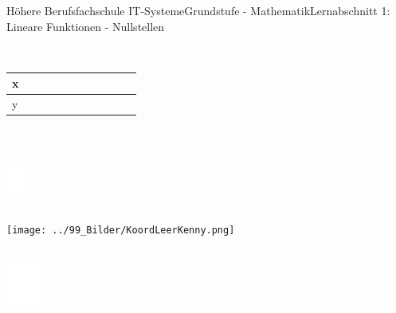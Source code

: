\documentclass[oneside,openany,headings=optiontotoc,11pt,numbers=noenddot]{scrreprt}
\begin{document}
\begin{worksheet}{Höhere Berufsfachschule IT-Systeme}{Grundstufe - Mathematik}{Lernabschnitt 1: Lineare Funktionen - Nullstellen}
\begin{framed}
		\end{framed}
		\begin{framed}
			\noindent
			\small{\color{codegray}{Wertetabelle}}\\
			\par\noindent
			\normalsize
			\begin{tabularx}{\textwidth}{M|M|M|M|M|M|M|M|M|M|M}
				x & & & & & & & & & &\\
				\hline
				y & & & & & & & & & &\\
			\end{tabularx}\\
			\par\noindent
			\color{codegray}{Mit welchem Wertepaar können Sie Kenny seine Frage beantworten?}\\
			\includegraphics[width=0.05\textwidth]{../../empty.jpg}\\
		\end{framed}
		\newpage
		\begin{framed}
			\noindent
			\small{\color{codegray}{Graph}}\\
			\texttt{[image: ../99\_Bilder/KoordLeerKenny.png]}\\
			\par\noindent
			\color{codegray}{Welcher Punkt des Graphen beantwortet Kennys Frage und wieso?}\\
			\includegraphics[width=0.1\textwidth]{../../empty.jpg}\\
		\end{framed}
	\end{worksheet}
\end{document}
